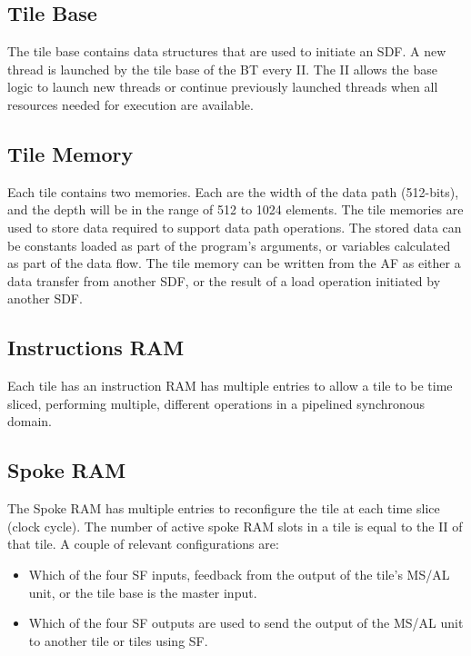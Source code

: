 \subsection{Tile Base}
The tile base contains data structures that are used to initiate an SDF.
A new thread is launched by the tile base of the BT every II.
The II allows the base logic to launch new threads or continue previously launched threads when all resources needed for execution are available.

\subsection{Tile Memory}
Each tile contains two memories.
Each are the width of the data path (512-bits), and the depth will be in the range of 512 to 1024 elements.
The tile memories are used to store data required to support data path operations.
The stored data can be constants loaded as part of the program's arguments, or variables calculated as part of the data flow.
The tile memory can be written from the AF as either a data transfer from another SDF, or the result of a load operation initiated by another SDF.

\subsection{Instructions RAM}
Each tile has an instruction RAM has multiple entries to allow a tile to be time sliced, performing multiple, different operations in a pipelined synchronous domain.

\subsection{Spoke RAM}
The Spoke RAM has multiple entries to reconfigure the tile at each time slice (clock cycle).
The number of active spoke RAM slots in a tile is equal to the II of that tile.
A couple of relevant configurations are: 

\begin{itemize}
  \item Which of the four SF inputs, feedback from the output of the tile's MS/AL unit, or the tile base is the master input.
  \item Which of the four SF outputs are used to send the output of the MS/AL unit to another tile or tiles using SF.
\end{itemize}

